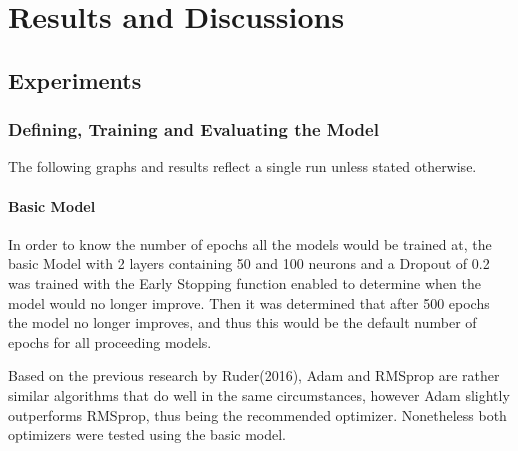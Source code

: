 \documentclass[10pt,11pt,12pt,oneside]{book}
\begin{document}
\chapter{Results and Discussions}
\section{Experiments}

\subsection{Defining, Training and Evaluating the Model}
The following graphs and results reflect a single run unless stated otherwise.
\subsubsection{Basic Model}
In order to know the number of epochs all the models would be trained at, the basic Model with 2 layers containing 50 and 100 neurons and a Dropout of 0.2 was trained with the Early Stopping function enabled to determine when the model would no longer improve. Then it was determined that after 500 epochs the model no longer improves, and thus this would be the default number of epochs for all proceeding models.

Based on the previous research by Ruder(2016), Adam
and RMSprop are rather similar algorithms that do well in the same circumstances, however Adam slightly outperforms RMSprop, thus being the recommended optimizer. \cite{DBLP:journals/corr/Ruder16} Nonetheless both optimizers were tested using the basic model.\\
\end{document}
